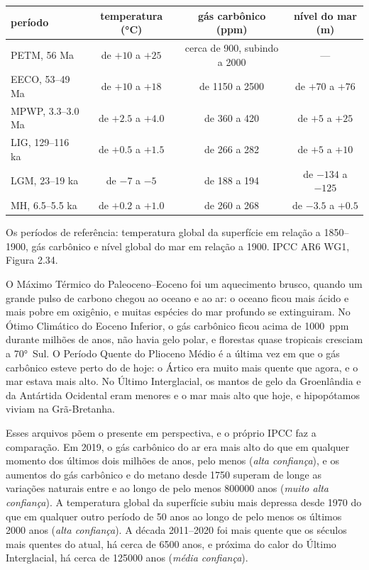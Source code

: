 \begin{center}
\small
\begin{tabular}{|l|c|c|c|}
\hline
\textbf{período} & \textbf{temperatura (\unit{\degreeCelsius})} & \textbf{gás carbônico (ppm)} & \textbf{nível do mar (m)} \\
\hline
PETM, 56 Ma & de $+10$ a $+25$ & cerca de 900, subindo a 2000 & --- \\
EECO, 53--49 Ma & de $+10$ a $+18$ & de 1150 a 2500 & de $+70$ a $+76$ \\
MPWP, 3.3--3.0 Ma & de $+2.5$ a $+4.0$ & de 360 a 420 & de $+5$ a $+25$ \\
LIG, 129--116 ka & de $+0.5$ a $+1.5$ & de 266 a 282 & de $+5$ a $+10$ \\
\textcolor{omCold}{LGM, 23--19 ka} & \textcolor{omCold}{de $-7$ a $-5$} & \textcolor{omCold}{de 188 a 194} & \textcolor{omCold}{de $-134$ a $-125$} \\
MH, 6.5--5.5 ka & de $+0.2$ a $+1.0$ & de 260 a 268 & de $-3.5$ a $+0.5$ \\
\hline
\end{tabular}

\medskip
{\small Os períodos de referência: temperatura global da superfície em
relação a 1850--1900, gás carbônico e nível global do mar em relação a 1900.
IPCC AR6 WG1, Figura 2.34.}
\end{center}

O Máximo Térmico do Paleoceno--Eoceno foi um aquecimento brusco, quando um
grande pulso de carbono chegou ao oceano e ao ar: o oceano ficou mais ácido
e mais pobre em oxigênio, e muitas espécies do mar profundo se extinguiram.
No Ótimo Climático do Eoceno Inferior, o gás carbônico ficou acima de
\qty{1000}{ppm} durante milhões de anos, não havia gelo polar, e florestas
quase tropicais cresciam a \ang{70}~Sul. O Período Quente do Plioceno Médio
é a última vez em que o gás carbônico esteve perto do de hoje: o Ártico era
muito mais quente que agora, e o mar estava mais alto. No Último
Interglacial, os mantos de gelo da Groenlândia e da Antártida Ocidental eram
menores e o mar mais alto que hoje, e hipopótamos viviam na Grã-Bretanha.

Esses arquivos põem o presente em perspectiva, e o próprio IPCC faz a
comparação. Em 2019, o gás carbônico do ar era mais alto do que em qualquer
momento dos últimos dois milhões de anos, pelo menos (\emph{alta
confiança}), e os aumentos do gás carbônico e do metano desde 1750 superam
de longe as variações naturais entre  e  ao
longo de pelo menos \num{800000} anos (\emph{muito alta confiança}). A
temperatura global da superfície subiu mais depressa desde 1970 do que em
qualquer outro período de 50 anos ao longo de pelo menos os últimos
\num{2000} anos (\emph{alta confiança}). A década 2011--2020 foi mais quente
que os séculos mais quentes do  atual, há cerca de \num{6500}
anos, e próxima do calor do Último Interglacial, há cerca de \num{125000}
anos (\emph{média confiança}).

